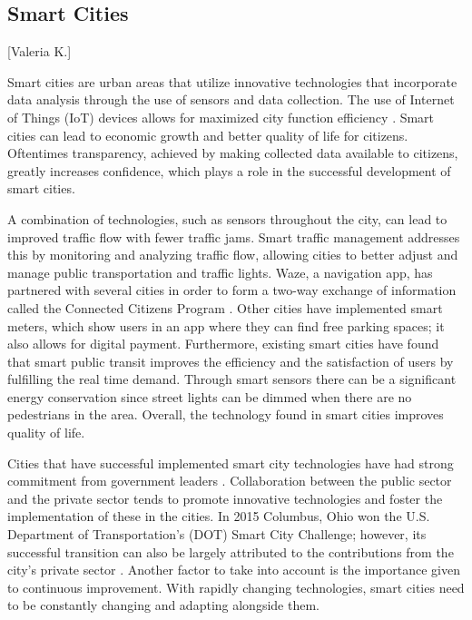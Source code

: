 \documentclass[12pt]{article}                         %
\begin{document}
\subsection{Smart Cities}[Valeria K.]

Smart cities are urban areas that utilize innovative technologies that incorporate data analysis through the use of sensors and data collection. The use of Internet of Things (IoT) devices allows for maximized city function efficiency \cite{RouseSmartCity}. Smart cities can lead to economic growth and better quality of life for citizens. Oftentimes transparency, achieved by making collected data available to citizens, greatly increases confidence, which plays a role in the successful development of smart cities.

A combination of technologies, such as sensors throughout the city, can lead to improved traffic flow with fewer traffic jams. Smart traffic management addresses this by  monitoring and analyzing traffic flow, allowing cities to better adjust and manage public transportation and traffic lights. Waze, a navigation app, has partnered with several cities in order to form a two-way exchange of information called the Connected Citizens Program \cite{Stern2016WazeMobility}. Other cities have implemented smart meters, which show users in an app where they can find free parking spaces; it also allows for digital payment. Furthermore, existing smart cities have found that smart public transit improves the efficiency and the satisfaction of users by fulfilling the real time demand. Through smart sensors there can be a significant energy conservation since street lights can be dimmed when there are no pedestrians in the area. Overall, the technology found in smart cities improves quality of life.

Cities that have successful implemented smart city technologies have had strong commitment from government leaders \cite{Zanghi2017WhyExamples}. Collaboration between the public sector and the private sector tends to promote innovative technologies and foster the implementation of these in the cities. In 2015 Columbus, Ohio won the U.S. Department of Transportation’s (DOT) Smart City Challenge; however, its successful transition can also be largely attributed to the contributions from the city's private sector \cite{FERAN2017SiliconOhio}. Another factor to take into account is the importance given to continuous improvement. With rapidly changing technologies, smart cities need to be constantly changing and adapting alongside them.
\end{document}
